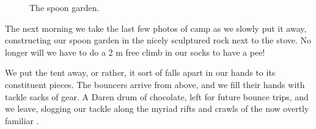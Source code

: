 \begin{figure}
\checkoddpage \ifoddpage \forcerectofloat \else \forceversofloat \fi
\centering
 \caption{The spoon garden. }
 \label{spoons}
\end{figure}



The next morning we take the last few photos of camp as we slowly put it
away, constructing our spoon garden in the nicely sculptured rock next
to the stove. No longer will we have to do a 2 m free climb in our socks
to have a pee!

We put the tent away, or rather, it sort of falls apart in our hands to
its constituent pieces. The bouncers arrive from above, and we fill
their hands with tackle sacks of gear. A Daren drum of chocolate, left
for future bounce trips, and we leave, slogging our tackle along the
myriad rifts and crawls of the now overtly familiar .


